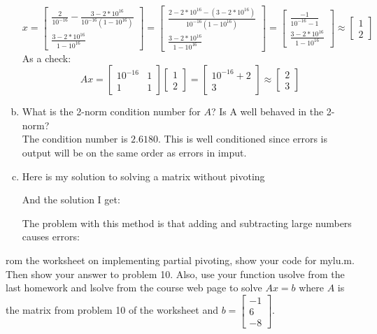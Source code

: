 \documentclass[12pt]{article}
\makeatletter
\theoremstyle{homework}
\newenvironment{exercise}[1]
{\def\@currentlabel{#1}\exercisecore}
{\endexercisecore}
\makeatother
\begin{document}
\begin{enumerate}[(a)]
$$x=
\begin{bmatrix}
\frac{2}{10^{-16}}-\frac{3-2*10^{16}}{10^{-16}(1-10^{16})}\\
\frac{3-2*10^{16}}{1-10^{16}}
\end{bmatrix}=
\begin{bmatrix}
\frac{2-2*10^{16}-(3-2*10^{16})}{10^{-16}(1-10^{16})}\\
\frac{3-2*10^{16}}{1-10^{16}}
\end{bmatrix}=
\begin{bmatrix}
\frac{-1}{10^{-16}-1}\\
\frac{3-2*10^{16}}{1-10^{16}}
\end{bmatrix}\approx
\begin{bmatrix}
1\\
2
\end{bmatrix}
$$
As a check:
$$Ax=\begin{bmatrix}
10^{-16} & 1\\
1 & 1
\end{bmatrix}
\begin{bmatrix}
1\\
2
\end{bmatrix}=
\begin{bmatrix}
10^{-16}+2\\
3
\end{bmatrix}\approx
\begin{bmatrix}
2\\
3
\end{bmatrix}
$$
\item
What is the 2-norm condition number for $A$?  Is A well behaved in the 2-norm?\\
The condition number is $2.6180$.  This is well conditioned since errors is output will be on the same order as errors in imput.
\item
Here is my solution to solving a matrix without pivoting

And the solution I get:

The problem with this method is that adding and subtracting large numbers causes errors:

\end{enumerate}
\begin{exercise}

From the worksheet on implementing partial pivoting, show your code for mylu.m. Then
show your answer to problem 10. Also, use your function usolve from the last homework
and lsolve from the course web page to solve $Ax = b$ where $A$ is the matrix from
problem 10 of the worksheet and $b = \begin{bmatrix}-1\\ 6\\ -8\end{bmatrix}$.
\end{exercise}

\end{document}
